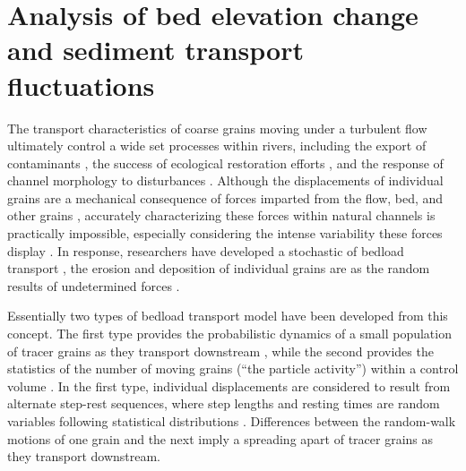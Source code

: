 
\chapter{Analysis of bed elevation change and sediment transport fluctuations}
\label{ch:ch3}

The transport characteristics of coarse grains moving under a turbulent flow ultimately control a wide set processes within rivers, including the export of contaminants \citep{Malmon2005,Macklin2006}, the success of ecological restoration efforts \citep{Gaeuman2017}, and the response of channel morphology to disturbances \citep{Hassan2017}.
Although the displacements of individual grains are a mechanical consequence of forces imparted from the flow, bed, and other grains \citep{Wiberg1985, Vowinckel2014,Gonzalez2017}, accurately characterizing these forces within natural channels is practically impossible, especially considering the intense variability these forces display \citep{Schmeeckle2007,Celik2010, Dwivedi2011}.
In response, researchers have developed a stochastic \DIFdelbegin {}\DIFdelend \DIFaddbegin {}\DIFaddend of bedload transport \citep{Einstein1937}, \DIFdelbegin {}\DIFdelend \DIFaddbegin {}\DIFaddend the erosion and deposition of individual grains are \DIFdelbegin {}\DIFdelend \DIFaddbegin {}\DIFaddend as the random results of undetermined forces \citep{Einstein1950,Paintal1971,Ancey2006}.

Essentially two types of bedload transport model have been developed from this concept.
The first type provides the probabilistic dynamics of a small population of tracer grains as they transport downstream \citep{Einstein1937,Hubbell1964, Nakagawa1976,Martin2012,Lajeunesse2017,Wu2019}, while the second provides the statistics of the number of moving grains (``the particle activity'') within a control volume \citep{Einstein1950,Ancey2006,Furbish2012a}.
In the first type, individual displacements are considered to result from alternate step-rest sequences, where step lengths and resting times are random variables following statistical distributions \citep{Einstein1937}. 
Differences between the random-walk motions of one grain and the next imply a spreading apart \DIFaddbegin {}\DIFaddend of tracer grains as they transport downstream\DIFdelbegin {}\DIFdelend .

